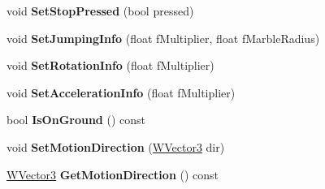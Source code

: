 \begin{DoxyCompactItemize}
\item 
void {\bfseries Set\+Stop\+Pressed} (bool pressed)\hypertarget{class_w_marble_action_aff88d139a0a4c1ae9a2b3ae708478538}{}\label{class_w_marble_action_aff88d139a0a4c1ae9a2b3ae708478538}

\item 
void {\bfseries Set\+Jumping\+Info} (float f\+Multiplier, float f\+Marble\+Radius)\hypertarget{class_w_marble_action_a14302384b7ccdf2da793c6fb55647397}{}\label{class_w_marble_action_a14302384b7ccdf2da793c6fb55647397}

\item 
void {\bfseries Set\+Rotation\+Info} (float f\+Multiplier)\hypertarget{class_w_marble_action_a292db2891d003dd872de64f526e96b20}{}\label{class_w_marble_action_a292db2891d003dd872de64f526e96b20}

\item 
void {\bfseries Set\+Acceleration\+Info} (float f\+Multiplier)\hypertarget{class_w_marble_action_aa1bc67c95dd103b65ce367a89fbafdde}{}\label{class_w_marble_action_aa1bc67c95dd103b65ce367a89fbafdde}

\item 
bool {\bfseries Is\+On\+Ground} () const \hypertarget{class_w_marble_action_ae6d3156c4890d0543ad85bea9ce0fb54}{}\label{class_w_marble_action_ae6d3156c4890d0543ad85bea9ce0fb54}

\item 
void {\bfseries Set\+Motion\+Direction} (\hyperlink{class_w_vector3}{W\+Vector3} dir)\hypertarget{class_w_marble_action_ab870f71fab4073ce01885dc1f2ed0995}{}\label{class_w_marble_action_ab870f71fab4073ce01885dc1f2ed0995}

\item 
\hyperlink{class_w_vector3}{W\+Vector3} {\bfseries Get\+Motion\+Direction} () const \hypertarget{class_w_marble_action_af563d9853a24040160b0177e57009849}{}\label{class_w_marble_action_af563d9853a24040160b0177e57009849}

\end{DoxyCompactItemize}
